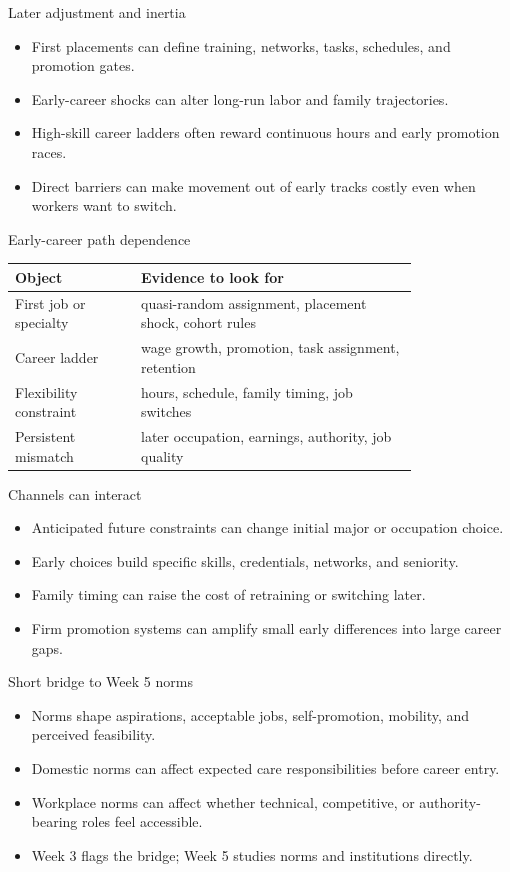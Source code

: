 \documentclass[aspectratio=169,11pt]{beamer}
\begin{document}
\begin{frame}{Later adjustment and inertia}
\begin{itemize}
    \item First placements can define training, networks, tasks, schedules, and promotion gates.
    \item Early-career shocks can alter long-run labor and family trajectories.
    \item High-skill career ladders often reward continuous hours and early promotion races.
    \item Direct barriers can make movement out of early tracks costly even when workers want to switch.
\end{itemize}
\end{frame}

\begin{frame}{Early-career path dependence}
\small
\begin{tabular}{p{0.25\linewidth} p{0.55\linewidth}}
\toprule
Object & Evidence to look for \\
\midrule
First job or specialty & quasi-random assignment, placement shock, cohort rules \\
Career ladder & wage growth, promotion, task assignment, retention \\
Flexibility constraint & hours, schedule, family timing, job switches \\
Persistent mismatch & later occupation, earnings, authority, job quality \\
\bottomrule
\end{tabular}
\end{frame}

\begin{frame}{Channels can interact}
\begin{itemize}
    \item Anticipated future constraints can change initial major or occupation choice.
    \item Early choices build specific skills, credentials, networks, and seniority.
    \item Family timing can raise the cost of retraining or switching later.
    \item Firm promotion systems can amplify small early differences into large career gaps.
\end{itemize}
\end{frame}

\begin{frame}{Short bridge to Week 5 norms}
\begin{itemize}
    \item Norms shape aspirations, acceptable jobs, self-promotion, mobility, and perceived feasibility.
    \item Domestic norms can affect expected care responsibilities before career entry.
    \item Workplace norms can affect whether technical, competitive, or authority-bearing roles feel accessible.
    \item Week 3 flags the bridge; Week 5 studies norms and institutions directly.
\end{itemize}
\end{frame}
\end{document}
